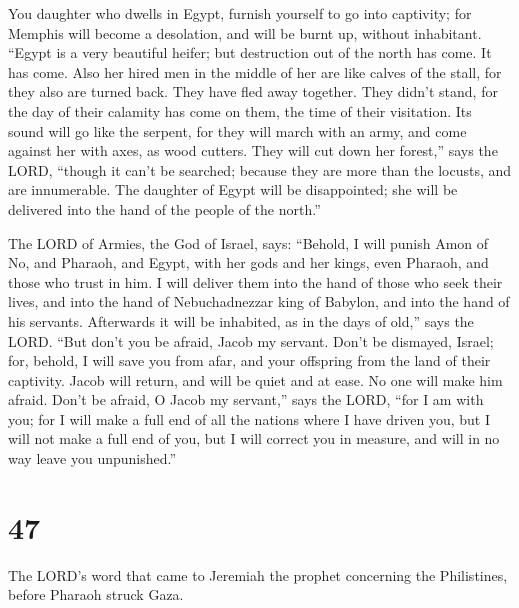  You daughter who dwells in Egypt, furnish yourself to go
into captivity; for Memphis will become a desolation, and will be burnt
up, without inhabitant.  ``Egypt is a very beautiful
heifer; but destruction out of the north has come. It has come.
 Also her hired men in the middle of her are like calves of
the stall, for they also are turned back. They have fled away together.
They didn't stand, for the day of their calamity has come on them, the
time of their visitation.  Its sound will go like the
serpent, for they will march with an army, and come against her with
axes, as wood cutters.  They will cut down her forest,''
says the LORD, ``though it can't be searched; because they are more than
the locusts, and are innumerable.  The daughter of Egypt
will be disappointed; she will be delivered into the hand of the people
of the north.''

 The LORD of Armies, the God of Israel, says: ``Behold, I
will punish Amon of No, and Pharaoh, and Egypt, with her gods and her
kings, even Pharaoh, and those who trust in him.  I will
deliver them into the hand of those who seek their lives, and into the
hand of Nebuchadnezzar king of Babylon, and into the hand of his
servants. Afterwards it will be inhabited, as in the days of old,'' says
the LORD.  ``But don't you be afraid, Jacob my servant.
Don't be dismayed, Israel; for, behold, I will save you from afar, and
your offspring from the land of their captivity. Jacob will return, and
will be quiet and at ease. No one will make him afraid. 
Don't be afraid, O Jacob my servant,'' says the LORD, ``for I am with
you; for I will make a full end of all the nations where I have driven
you, but I will not make a full end of you, but I will correct you in
measure, and will in no way leave you unpunished.''

\hypertarget{section-46}{%
\section{47}\label{section-46}}

 The LORD's word that came to Jeremiah the prophet
concerning the Philistines, before Pharaoh struck Gaza.

